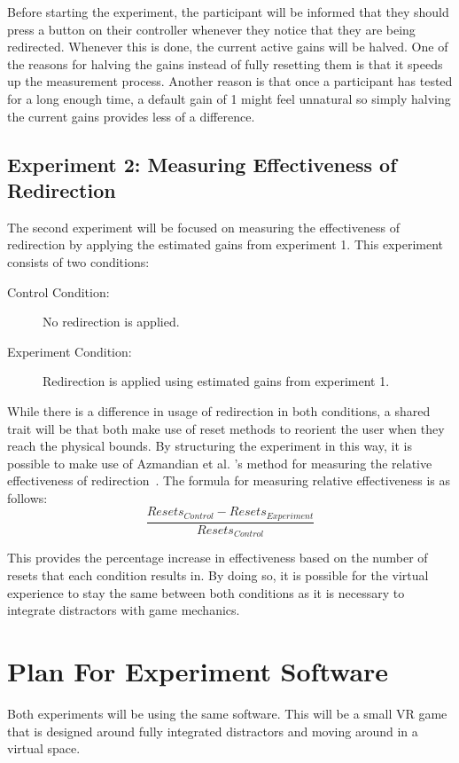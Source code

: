 Before starting the experiment, the participant will be informed that they should press a button on their controller whenever they notice that they are being redirected. Whenever this is done, the current active gains will be halved. One of the reasons for halving the gains instead of fully resetting them is that it speeds up the measurement process. Another reason is that once a participant has tested for a long enough time, a default gain of 1 might feel unnatural so simply halving the current gains provides less of a difference. 

\subsection{Experiment 2: Measuring Effectiveness of Redirection}
The second experiment will be focused on measuring the effectiveness of redirection by applying the estimated gains from experiment 1. This experiment consists of two conditions:

\begin{description}
\item[Control Condition: ] No redirection is applied.
\item[Experiment Condition: ] Redirection is applied using estimated gains from experiment 1. 
\end{description}

While there is a difference in usage of redirection in both conditions, a shared trait will be that both make use of reset methods to reorient the user when they reach the physical bounds. By structuring the experiment in this way, it is possible to make use of Azmandian et al. 's method for measuring the relative effectiveness of redirection~\cite{azmandian2015physical}. The formula for measuring relative effectiveness is as follows:
$$
\frac{Resets_{Control} - Resets_{Experiment}}{Resets_{Control}}
$$

This provides the percentage increase in effectiveness based on the number of resets that each condition results in. By doing so, it is possible for the virtual experience to stay the same between both conditions as it is necessary to integrate distractors with game mechanics. 

\section{Plan For Experiment Software}
Both experiments will be using the same software. This will be a small VR game that is designed around fully integrated distractors and moving around in a virtual space. 

